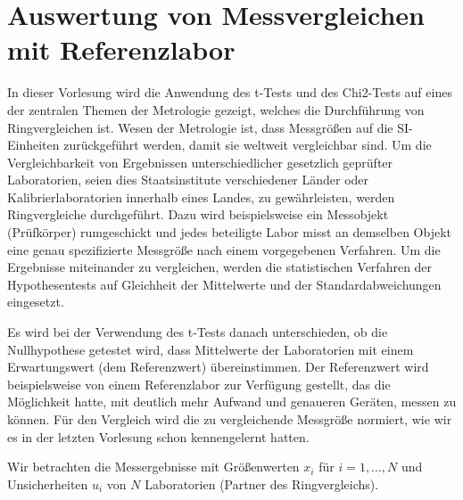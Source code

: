 
\section{Auswertung von Messvergleichen mit Referenzlabor}
In dieser Vorlesung wird die Anwendung des t-Tests und des Chi2-Tests auf eines der zentralen Themen der Metrologie gezeigt,
welches die Durchführung von Ringvergleichen ist. Wesen der Metrologie ist, dass Messgrößen auf die SI-Einheiten zurückgeführt werden,
damit sie weltweit vergleichbar sind. Um die Vergleichbarkeit von Ergebnissen unterschiedlicher gesetzlich geprüfter Laboratorien, seien dies Staatsinstitute verschiedener Länder oder Kalibrierlaboratorien innerhalb eines Landes, zu gewährleisten, werden Ringvergleiche durchgeführt.
Dazu wird beispielsweise ein Messobjekt (Prüfkörper) rumgeschickt und jedes beteiligte Labor misst an demselben Objekt eine genau spezifizierte Messgröße nach einem vorgegebenen Verfahren. Um die Ergebnisse miteinander zu vergleichen, werden die statistischen Verfahren der Hypothesentests auf Gleichheit der Mittelwerte und der Standard\-ab\-weichungen eingesetzt.

Es wird bei der Verwendung des t-Tests danach unterschieden, ob die Nullhypothese getestet wird, dass Mittelwerte der Laboratorien mit einem Erwartungswert (dem Referenzwert) übereinstimmen.
Der Referenzwert wird beispielsweise von einem Referenzlabor zur Verfügung gestellt, das die Möglichkeit hatte, mit deutlich mehr Aufwand und genaueren Geräten, messen zu können.
Für den Vergleich wird die zu vergleichende Messgröße normiert, wie wir es in der letzten Vorlesung schon kennengelernt hatten.

Wir betrachten die Messergebnisse mit Größenwerten $x_i$ für $i = 1,\dots,N$ und Unsicherheiten $u_i$ von $N$ Laboratorien (Partner des Ringvergleichs).

